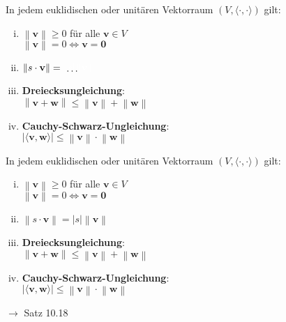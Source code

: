 \documentclass[11pt]{article}
\renewcommand{\cite}[1]{\par\bigskip\hfill{\color{gray}\tiny\(\to\) #1}}
\newcommand*{\abs}[1]{\left\vert#1\right\vert}
\newcommand*{\norm}[1]{\left\|#1\right\|}
\newcommand*{\scprod}[2]{\langle #1, #2\rangle} %
\renewcommand{\leq}{\leqslant}
\renewcommand{\geq}{\geqslant}
\renewcommand{\vec}[1]{\mathbf{#1}}
\newcommand{\hide}[1]{\parbox{0cm}{\raisebox{-7pt}[0cm]{\dots}}\color{white}#1\color{black}}
\let\olddots\dots
\renewcommand{\dots}{\,\olddots\,}
\newenvironment{field}{}{\newpage}
\newif\ifnote
\newenvironment{note}{\notetrue}{\notefalse}
\begin{document}
\begin{note}
    \begin{field}
        In jedem euklidischen oder unitären Vektorraum \((V, \scprod{\cdot}{\cdot})\) gilt:
        \begin{enumerate}[(i)]
            \item \(\norm{\vec{v}} \geq 0\) für alle \(\vec{v}\in V\) \\
                  \(\norm{\vec{v}} = 0 \Leftrightarrow \vec{v} = \vec{0}\)
            \item \(\norm{s\cdot\vec{v}} = \hide{\abs{s}\norm{\vec{v}}}\)
            \item \textbf{Dreiecksungleichung}:\\
                  \(\norm{\vec{v}+ \vec{w}} \leq \norm{\vec{v}} + \norm{\vec{w}}\)
            \item \textbf{Cauchy-Schwarz-Ungleichung}:\\
                  \(\abs{\scprod{\vec{v}}{\vec{w}}} \leq \norm{\vec{v}}\cdot\norm{\vec{w}}\)
        \end{enumerate}
    \end{field}
    \begin{field}
        In jedem euklidischen oder unitären Vektorraum \((V, \scprod{\cdot}{\cdot})\) gilt:
        \begin{enumerate}[(i)]
            \item \(\norm{\vec{v}} \geq 0\) für alle \(\vec{v}\in V\) \\
                  \(\norm{\vec{v}} = 0 \Leftrightarrow \vec{v} = \vec{0}\)
            \item \(\norm{s\cdot\vec{v}} = \abs{s}\norm{\vec{v}}\)
            \item \textbf{Dreiecksungleichung}:\\
                  \(\norm{\vec{v}+ \vec{w}} \leq \norm{\vec{v}} + \norm{\vec{w}}\)
            \item \textbf{Cauchy-Schwarz-Ungleichung}:\\
                  \(\abs{\scprod{\vec{v}}{\vec{w}}} \leq \norm{\vec{v}}\cdot\norm{\vec{w}}\)
        \end{enumerate}
        \cite{Satz 10.18}
    \end{field}


\end{note}
\end{document}
